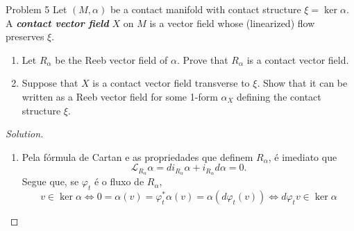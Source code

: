 \begin{thing4}{Problem 5}\leavevmode
	Let $(M,\alpha)$ be a contact manifold with contact structure $\xi=\ker \alpha$. A \textit{\textbf{contact vector field}} $X$ on $M$ is a vector field whose (linearized) flow preserves $\xi$.
	\begin{enumerate}[label=(\alph*)]
	\item Let $R_\alpha$ be the Reeb vector field of $\alpha$. Prove that $R_\alpha$ is a contact vector field.
	\item Suppose that $X$ is a contact vector field transverse to $\xi$. Show that it can be written as a Reeb vector field for some 1-form $\alpha_X$ defining the contact structure $\xi$.
	\end{enumerate}
\end{thing4}

\begin{proof}[Solution]\leavevmode
\begin{enumerate}[label=(\alph*)]
\item Pela  fórmula de Cartan e as propriedades que definem $R_\alpha$, é imediato que
	\[\mathcal{L}_{R_\alpha}\alpha=d i_{R_\alpha}\alpha+i_{R_\alpha}d\alpha=0.\]
	Segue que, se $\varphi_t$ é o fluxo de $R_\alpha$,
	\[v \in \ker \alpha \iff 0=\alpha(v)=\varphi^*_t\alpha(v)=\alpha(d\varphi_t(v)) \iff d\varphi_tv \in \ker \alpha\]
	
	
\end{enumerate}
\end{proof}

\printbibliography


